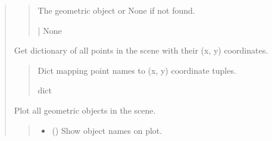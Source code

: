 \documentclass[letterpaper,10pt,english]{sphinxmanual}
\begin{document}
\begin{quote}
\begin{fulllineitems}
\begin{fulllineitems}
\begin{quote}
\begin{description}
\begin{itemize}
\end{itemize}

\sphinxAtStartPar
The geometric object or None if not found.

\sphinxAtStartPar
{} | None

\end{description}\end{quote}

\end{fulllineitems}


\begin{fulllineitems}
\label{\detokenize{pygeox:pygeox.geoscene.GeoScene.get_points}}
\pysigstartsignatures
\pysiglinewithargsret
{}
{}
{}
\pysigstopsignatures
\sphinxAtStartPar
Get dictionary of all points in the scene with their (x, y) coordinates.
\begin{quote}\begin{description}
\sphinxAtStartPar
Dict mapping point names to (x, y) coordinate tuples.

\sphinxAtStartPar
dict

\end{description}\end{quote}

\end{fulllineitems}


\begin{fulllineitems}
\label{\detokenize{pygeox:pygeox.geoscene.GeoScene.plot}}
\pysigstartsignatures
\pysiglinewithargsret
{}
{\sphinxparamcomma {}\sphinxparamcomma {}\sphinxparamcomma {}\sphinxparamcomma {}}
{}
\pysigstopsignatures
\sphinxAtStartPar
Plot all geometric objects in the scene.
\begin{quote}\begin{description}
\begin{itemize}
\item {} 
\sphinxAtStartPar
{} () \textendash{} Show object names on plot.


\end{itemize}
\end{description}
\end{quote}
\end{fulllineitems}
\end{fulllineitems}
\end{quote}
\end{document}
